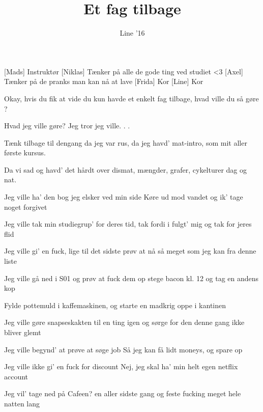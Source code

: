 \documentclass[a4paper,11pt]{article}
\title{Et fag tilbage}
\author{Line ’16}
\begin{document}
\maketitle

\begin{roles}
[Mads] Instruktør
[Niklas] Tænker på alle de gode ting ved studiet <3
[Axel] Tænker på de pranks man kan nå at lave
[Frida] Kor
[Line] Kor
\end{roles}

\begin{song}


%
Okay, hvis du fik at vide du kun havde et enkelt fag tilbage,
hvad ville du så gøre ?

%
Hvad jeg ville gøre? Jeg tror jeg ville. . .

Tænk tilbage til dengang da jeg var rus,
da jeg havd’ mat-intro, som mit aller første kursus.

Da vi sad og havd’ det hårdt over dismat,
mængder, grafer, cykelturer dag og nat.

Jeg ville ha’ den bog jeg elsker ved min side
Køre ud mod vandet og ik’ tage noget forgivet

Jeg ville tak min studiegrup’ for deres tid,
tak fordi i fulgt’ mig og tak for jeres flid

%
Jeg ville gi’ en fuck, lige til det sidste
prøv at nå så meget som jeg kan fra denne liste

Jeg ville gå ned i S01 og prøv at fuck dem op
stege bacon kl. 12 og tag en andens kop

Fylde pottemuld i kaffemaskinen,
og starte en madkrig oppe i kantinen

Jeg ville gøre snapseskakten til en ting igen
og sørge for den denne gang ikke bliver glemt

%
Jeg ville begynd’ at prøve at søge job
Så jeg kan få lidt moneys, og spare op

Jeg ville ikke gi’ en fuck for discount
Nej, jeg skal ha’ min helt egen netflix account

Jeg vil’ tage ned på Cafeen? en aller sidste gang
og feste fucking meget hele natten lang


\end{song}
\end{document}
